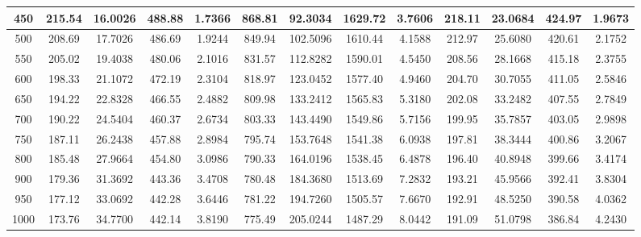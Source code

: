 \documentclass[12pt]{article}
\begin{document}
\begin{table}[ht]
{\begin{tabular}{ |c |c | c | c | c | c | c | c | c | c | c | c | c | }
      450
      & 215.54 & 16.0026 & 488.88 & 1.7366
      & 868.81 & 92.3034 & 1629.72 & 3.7606
      & 218.11 & 23.0684 & 424.97 & 1.9673 \\ \hline
      500
      & 208.69 & 17.7026 & 486.69 & 1.9244
      & 849.94 & 102.5096 & 1610.44 & 4.1588
      & 212.97 & 25.6080 & 420.61 & 2.1752 \\ \hline
      550
      & 205.02 & 19.4038 & 480.06 & 2.1016
      & 831.57 & 112.8282 & 1590.01 & 4.5450
      & 208.56 & 28.1668 & 415.18 & 2.3755 \\ \hline
      600
      & 198.33 & 21.1072 & 472.19 & 2.3104
      & 818.97 & 123.0452 & 1577.40 & 4.9460
      & 204.70 & 30.7055 & 411.05 & 2.5846 \\ \hline
      650
      & 194.22 & 22.8328 & 466.55 & 2.4882
      & 809.98 & 133.2412 & 1565.83 & 5.3180
      & 202.08 & 33.2482 & 407.55 & 2.7849 \\ \hline
      700
      & 190.22 & 24.5404 & 460.37 & 2.6734
      & 803.33 & 143.4490 & 1549.86 & 5.7156
      & 199.95 & 35.7857 & 403.05 & 2.9898 \\ \hline
      750
      & 187.11 & 26.2438 & 457.88 & 2.8984
      & 795.74 & 153.7648 & 1541.38 & 6.0938
      & 197.81 & 38.3444 & 400.86 & 3.2067 \\ \hline
      800
      & 185.48 & 27.9664 & 454.80 & 3.0986
      & 790.33 & 164.0196 & 1538.45 & 6.4878
      & 196.40 & 40.8948 & 399.66 & 3.4174 \\ \hline
      900
      & 179.36 & 31.3692 & 443.36 & 3.4708
      & 780.48 & 184.3680 & 1513.69 & 7.2832
      & 193.21 & 45.9566 & 392.41 & 3.8304 \\ \hline
      950
      & 177.12 & 33.0692 & 442.28 & 3.6446
      & 781.22 & 194.7260 & 1505.57 & 7.6670
      & 192.91 & 48.5250 & 390.58 & 4.0362 \\ \hline
      1000
      & 173.76 & 34.7700 & 442.14 & 3.8190
      & 775.49 & 205.0244 & 1487.29 & 8.0442
      & 191.09 & 51.0798 & 386.84 & 4.2430 \\ \hline
    \end{tabular}
  }
\end{table}
\end{document}
